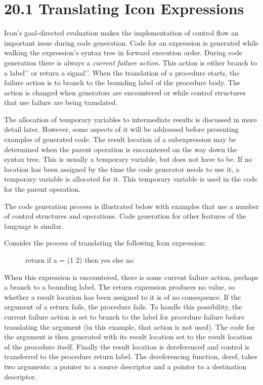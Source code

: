 \section[20.1 Translating Icon Expressions]{20.1 Translating Icon Expressions}

Icon's goal-directed evaluation makes the implementation of control
flow an important issue during code generation. Code for an expression
is generated while walking the expression's syntax tree in forward
execution order. During code generation there is always a
\textit{current failure action}. This action is either
{\textasciigrave}{\textasciigrave}branch to a label'{}' or
{\textasciigrave}{\textasciigrave}return a signal'{}'. When the
translation of a procedure starts, the failure action is to branch to
the bounding label of the procedure body. The action is changed when
generators are encountered or while control structures that use
failure are being translated.

The allocation of temporary variables to intermediate results is
discussed in more detail later. However, some aspects of it will be
addressed before presenting examples of generated code. The result
location of a subexpression may be determined when the parent
operation is encountered on the way down the syntax tree. This is
usually a temporary variable, but does not have to be. If no location
has been assigned by the time the code generator needs to use it, a
temporary variable is allocated for it. This temporary variable is
used in the code for the parent operation.

The code generation process is illustrated below with examples that
use a number of control structures and operations.  Code generation
for other features of the language is similar.

Consider the process of translating the following Icon expression: 

{\ttfamily\mdseries
\ \ \ \ \ \ return if a = (1 {\textbar} 2) then {\textquotedbl}yes{\textquotedbl} else {\textquotedbl}no{\textquotedbl}}

When this expression is encountered, there is some current failure
action, perhaps a branch to a bounding label. The return expression
produces no value, so whether a result location has been assigned to
it is of no consequence. If the argument of a return fails, the
procedure fails. To handle this possibility, the current failure
action is set to branch to the label for procedure failure before
translating the argument (in this example, that action is not used).
The code for the argument is then generated with its result location
set to the result location of the procedure itself. Finally the result
location is dereferenced and control is transferred to the procedure
return label. The dereferencing function, deref, takes two arguments:
a pointer to a source descriptor and a pointer to a destination
descriptor.

